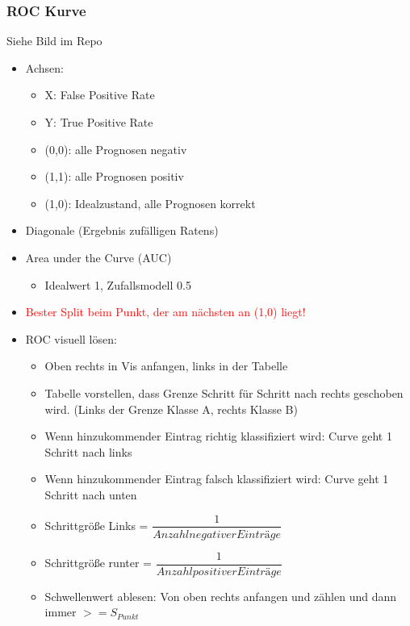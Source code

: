 \documentclass[a4paper]{article}
\begin{document}
\begin{landscape}
\begin{multicols}{3}
        \subsubsection{ROC Kurve}
        Siehe Bild im Repo
        \begin{itemize}[noitemsep,nolistsep]
            \item Achsen:
                \begin{itemize}[noitemsep,nolistsep]
                    \item X: False Positive Rate
                    \item Y: True Positive Rate
                    \item (0,0): alle Prognosen negativ
                    \item (1,1): alle Prognosen positiv 
                    \item (1,0): Idealzustand, alle Prognosen korrekt
                \end{itemize}
            \item Diagonale (Ergebnis zufälligen Ratens)
            \item Area under the Curve (AUC)
                \begin{itemize}[noitemsep,nolistsep]
                    \item Idealwert 1, Zufallsmodell 0.5
                \end{itemize}
            \item \textcolor{red}{Bester Split beim Punkt, der am nächsten an (1,0) liegt!}
            \item ROC visuell lösen:
                \begin{itemize}[noitemsep,nolistsep]
                    \item Oben rechts in Vis anfangen, links in der Tabelle
                    \item Tabelle vorstellen, dass Grenze Schritt für Schritt nach rechts geschoben wird. (Links der Grenze Klasse A, rechts Klasse B)
                    \item Wenn hinzukommender Eintrag richtig klassifiziert wird: Curve geht 1 Schritt nach links
                    \item Wenn hinzukommender Eintrag falsch klassifiziert wird: Curve geht 1 Schritt nach unten
                    \item Schrittgröße Links  = $\dfrac{1}{Anzahl negativer Einträge}$
                    \item Schrittgröße runter  = $\dfrac{1}{Anzahl positiver Einträge}$
                    \item Schwellenwert ablesen: Von oben rechts anfangen und zählen und dann immer $>= S_{Punkt}$


\end{itemize}
\end{itemize}
\end{multicols}
\end{landscape}
\end{document}
